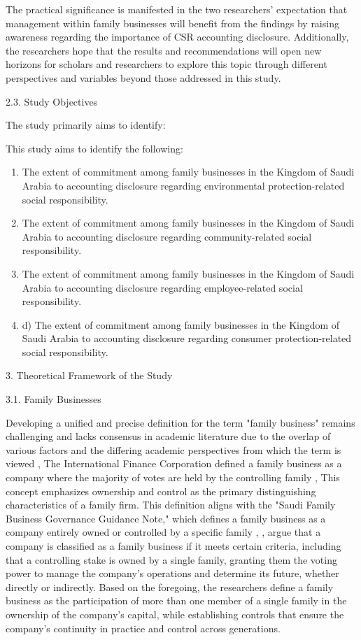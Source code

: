\documentclass{default}
\begin{document}
The practical significance is manifested in the two researchers' expectation that management within family businesses will benefit from the findings by raising awareness regarding the importance of CSR accounting disclosure. Additionally, the researchers hope that the results and recommendations will open new horizons for scholars and researchers to explore this topic through different perspectives and variables beyond those addressed in this study.

2.3. Study Objectives

The study primarily aims to identify:

This study aims to identify the following:

\begin{enumerate}
  \item The extent of commitment among family businesses in the Kingdom of Saudi Arabia to accounting disclosure regarding environmental protection-related social responsibility.
  \item The extent of commitment among family businesses in the Kingdom of Saudi Arabia to accounting disclosure regarding community-related social responsibility.
  \item The extent of commitment among family businesses in the Kingdom of Saudi Arabia to accounting disclosure regarding employee-related social responsibility.
  \item d) The extent of commitment among family businesses in the Kingdom of Saudi Arabia to accounting disclosure regarding consumer protection-related social responsibility.
\end{enumerate}

3. Theoretical Framework of the Study

3.1. Family Businesses

Developing a unified and precise definition for the term "family business" remains challenging and lacks consensus in academic literature due to the overlap of various factors and the differing academic perspectives from which the term is viewed \cite{ref12}, The International Finance Corporation defined a family business as a company where the majority of votes are held by the controlling family \cite{ref38}, This concept emphasizes ownership and control as the primary distinguishing characteristics of a family firm. This definition aligns with the "Saudi Family Business Governance Guidance Note," which defines a family business as a company entirely owned or controlled by a specific family \cite{ref11}, \cite{ref13}, argue that a company is classified as a family business if it meets certain criteria, including that a controlling stake is owned by a single family, granting them the voting power to manage the company's operations and determine its future, whether directly or indirectly. Based on the foregoing, the researchers define a family business as the participation of more than one member of a single family in the ownership of the company's capital, while establishing controls that ensure the company's continuity in practice and control across generations.
\end{document}

